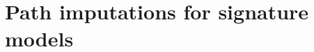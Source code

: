 \documentclass{article}
\begin{document}

\section{Path imputations for signature models}
\end{document}
